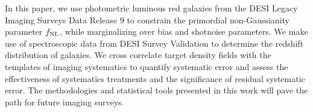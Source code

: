 In this paper, we use photometric luminous red galaxies from the DESI Legacy Imaging Surveys Data Release 9 to constrain the primordial non-Gaussianity parameter $f_{\rm NL}$, while marginalizing over bias and shotnoise parameters. We make use of spectroscopic data from DESI Survey Validation to determine the redshift distribution of galaxies. We cross correlate target density fields with the templates of imaging systematics to quantify systematic error and assess the effectiveness of systematics treatments and the significance of residual systematic error. The methodologies and statistical tools presented in this work will pave the path for future imaging surveys. 